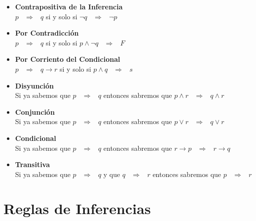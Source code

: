 \documentclass[12pt, fleqn]{report}                             %
\DeclareMathOperator \Space {\quad}                             %
\DeclareMathOperator \MiniSpace {\;}                            %
\newcommand \lequal {\MiniSpace \Leftrightarrow \MiniSpace}     %
\newcommand \linfire {\MiniSpace \Rightarrow \MiniSpace}        %
\begin{document}
                \begin{itemize}
                    \item
                        \textbf{Contrapositiva de la Inferencia}\\
                        $p \linfire q$ si y solo si $\lnot q \linfire \lnot p$

                    \item
                        \textbf{Por Contradicción}\\
                        $p \linfire q$ si y solo si $p \land \lnot q \linfire F$

                    \item
                        \textbf{Por Corriento del Condicional}\\
                        $p \linfire q \to r$ si y solo si $p \land q \linfire s$


                    \item
                        \textbf{Disyunción}\\
                        Si ya sabemos que $p \linfire q$ entonces sabremos que $p \land r \linfire q \land r$

                    \item
                        \textbf{Conjunción}\\
                        Si ya sabemos que $p \linfire q$ entonces sabremos que $p \lor r \linfire q \lor r$

                    \item
                        \textbf{Condicional}\\
                        Si ya sabemos que $p \linfire q$ entonces sabremos que $r \to p \linfire r \to q$

                    \item
                        \textbf{Transitiva}\\
                        Si ya sabemos que $p \linfire q$ y que $q \linfire r$ entonces sabremos que $p \linfire r$
                \end{itemize}        

               



        \clearpage
        \section{Reglas de Inferencias}
\end{document}
